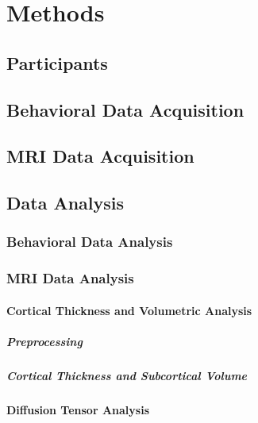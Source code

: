 

\section{Methods}

\subsection{Participants}

\subsection{Behavioral Data Acquisition}

\subsection{MRI Data Acquisition}

\subsection{Data Analysis}

\subsubsection{Behavioral Data Analysis} 

\subsubsection{MRI Data Analysis}
\paragraph{Cortical Thickness and Volumetric Analysis}
\subparagraph{Preprocessing}

\subparagraph{Cortical Thickness and Subcortical Volume}

\paragraph{Diffusion Tensor Analysis}









